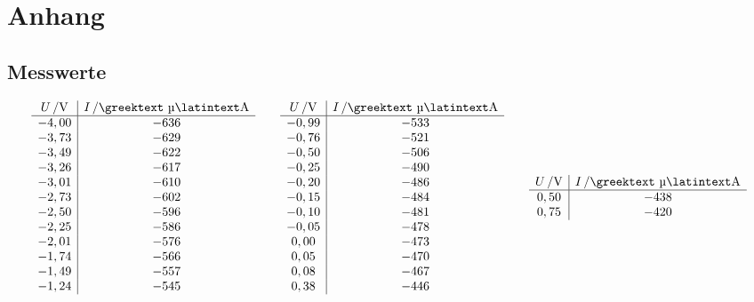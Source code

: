 \documentclass[numbers=noenddot,12pt,a4paper]{scrartcl}
\newcommand{\greek}[1]{\greektext#1\latintext}
\begin{document}
\section{Anhang}
\subsection{Messwerte}
\begin{table}[H]
	\begin{align*}
	\begin{array}{c|c}
	\unit[U]{/V} & \unit[I]{/\text{\greek{µ}}A}\\\hline
	-4,00 & -636 \\
	-3,73 & -629 \\
	-3,49 & -622 \\
	-3,26 & -617 \\
	-3,01 & -610 \\
	-2,73 & -602 \\
	-2,50 & -596 \\
	-2,25 & -586 \\
	-2,01 & -576 \\
	-1,74 & -566 \\
	-1,49 & -557 \\
	-1,24 & -545 \\
	\end{array}
	\hspace{2em}
	\begin{array}{c|c}
	\unit[U]{/V} & \unit[I]{/\text{\greek{µ}}A}\\\hline
	-0,99 & -533 \\
	-0,76 & -521 \\
	-0,50 & -506 \\
	-0,25 & -490 \\
	-0,20 & -486 \\
	-0,15 & -484 \\
	-0,10 & -481 \\
	-0,05 & -478 \\
	0,00 & -473 \\
	0,05 & -470 \\
	0,08 & -467 \\
	0,38 & -446 \\
	\end{array}
	\hspace{2em}
	\begin{array}{c|c}
	\unit[U]{/V} & \unit[I]{/\text{\greek{µ}}A}\\\hline
	0,50 & -438 \\
	0,75 & -420 \\

\end{array}
\end{align*}
\end{table}
\end{document}
